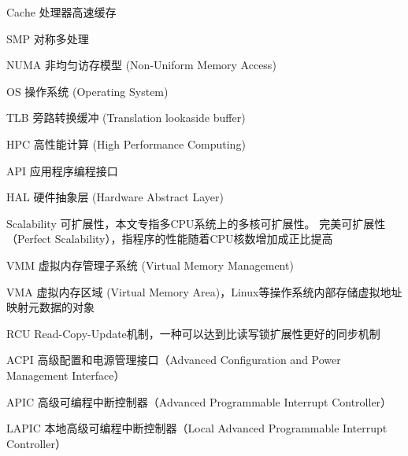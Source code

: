 \begin{denotation}

\item[Cache] 处理器高速缓存
\item[SMP] 对称多处理
\item[NUMA] 非均匀访存模型 (Non-Uniform Memory Access)
\item[OS] 操作系统 (Operating System)
\item[TLB] 旁路转换缓冲 (Translation lookaside buffer)
\item[HPC] 高性能计算 (High Performance Computing)
\item[API] 应用程序编程接口
\item[HAL] 硬件抽象层 (Hardware Abstract Layer)
\item[Scalability] 可扩展性，本文专指多CPU系统上的多核可扩展性。
	完美可扩展性（Perfect Scalability），指程序的性能随着CPU核数增加成正比提高
\item[VMM] 虚拟内存管理子系统 (Virtual Memory Management)
\item[VMA] 虚拟内存区域 (Virtual Memory
	Area)，Linux等操作系统内部存储虚拟地址映射元数据的对象
\item[RCU]
	Read-Copy-Update机制，一种可以达到比读写锁扩展性更好的同步机制
\item[ACPI] 高级配置和电源管理接口（Advanced Configuration and Power Management Interface）
\item[APIC] 高级可编程中断控制器（Advanced Programmable Interrupt Controller）
\item[LAPIC] 本地高级可编程中断控制器（Local Advanced Programmable Interrupt Controller）
\end{denotation}
